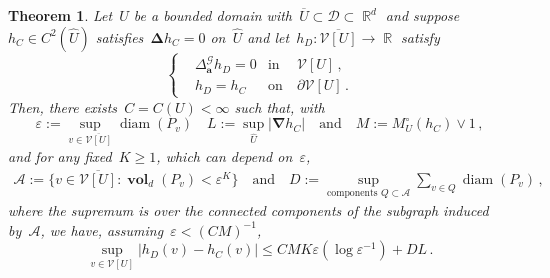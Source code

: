 \documentclass[12pt]{amsart}
\numberwithin{equation}{section}
\DeclareMathOperator{\R}{\mathbb{R}}
\DeclareMathOperator{\diam}{{\mathop{diam}}}
\newtheorem{theorem}{Theorem}[section]
\newcommand{\V}{\mathcal{V}}
\newcommand{\eps}{\varepsilon}
\newcommand{\CLap}{\boldsymbol{\Delta}}
\newcommand{\Cnabla}{\boldsymbol{\nabla}}
\newcommand{\aDelta}{\hyperref[eq:geometric-laplacian]{{\Delta^{\mathcal{G}}_{\cond}}}}
\newcommand{\cond}{\hyperref[eq:geometric-laplacian]{\mathbf{a}}}
\newcommand{\GCU}{\hyperref[eq:graph-closure]{\widehat{U}}}
\DeclareMathOperator{\vol}{\mathbf{vol}}
\begin{document}
\begin{theorem}
		\label{theorem:generaldim}
	Let~$U$ be a bounded domain with~$\overline{U} \subset \mathcal{D} \subset \R^d$ and suppose~$h_C \in C^{2}(\GCU)$ satisfies~$\CLap h_C = 0$ on~$\GCU$ and let~$h_D: \overline{\V[U]} \to \R$ satisfy 
	\[
	\left\{
	\begin{aligned}
		&  \aDelta h_D = 0 & \mbox{in} & \ \V[U] \,,
		\\
		& h_D = h_C & \mbox{on} & \  \partial \V[U] \, . 
	\end{aligned}
	\right.
	\]
	Then, there exists~$C= C(U) < \infty$ such that, with
	\[
	\eps := \sup_{v \in \overline{\V[U]}} \diam(P_v) \quad L := \sup_{\GCU} |\Cnabla h_C| \quad \mbox{and} \quad M := M_U^\circ(h_C) \vee 1 \, , 
	\]
	and for any fixed~$K \geq 1$, which can depend on~$\eps$,
	\begin{equation}
		\begin{aligned}
		\label{eq:small-volume-assumption}
		\mathcal{A} := \{ v \in \overline{\V[U]} : \vol_{d}(P_v) < \eps^{K}  \}  \quad \mbox{and} \quad
		D := \sup_{\mbox{components $Q \subset \mathcal{A}$}} {\sum_{v \in Q} \diam(P_v)}  \, , 
		\end{aligned}
	\end{equation}
	where the supremum is over the connected components of the subgraph induced by~$\mathcal{A}$, we have, assuming~{$\eps  < (C M)^{-1}$},
	\begin{equation} 
		\label{eq:full-bound}
{	 \sup_{v \in \V[U]} | h_D(v) - h_C(v) | \leq C M K \eps(\log \eps^{-1}) + D L  \, .}
	\end{equation}
\end{theorem}
\end{document}
